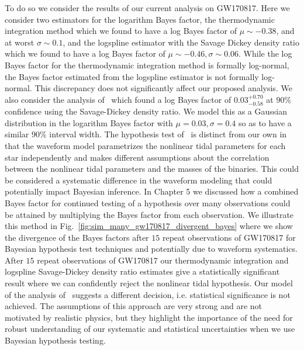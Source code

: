 To do so we consider the results of our current analysis on GW170817. Here we consider two estimators for the logarithm Bayes factor, the thermodynamic integration method which we found to have a log Bayes factor of $\mu \sim -0.38$, and at worst $\sigma \sim 0.1$, and the logspline estimator with the Savage Dickey density ratio which we found to have a log Bayes factor of $\mu \sim -0.46, \sigma \sim 0.06$. While the log Bayes factor for the thermodynamic integration method is formally log-normal, the Bayes factor estimated from the logspline estimator is not formally log-normal. This discrepancy does not significantly affect our proposed analysis. We also consider the analysis of~\cite{abbott2019constraining} which found a log Bayes factor of $0.03^{+0.70}_{-0.58}$ at $90 \%$ confidence using the Savage-Dickey density ratio. We model this as a Gaussian distribution in the logarithm Bayes factor with $\mu = 0.03, \sigma = 0.4$ so as to have a similar $90\%$ interval width. The hypothesis test of~\cite{abbott2019constraining} is distinct from our own in that the waveform model parametrizes the nonlinear tidal parameters for each star independently and makes different assumptions about the correlation between the nonlinear tidal parameters and the masses of the binaries. This could be considered a systematic difference in the waveform modeling that could potentially impact Bayesian inference. In Chapter 5 we discussed how a combined Bayes factor for continued testing of a hypothesis over many observations could be attained by multiplying the Bayes factor from each observation. We illustrate this method in Fig.~\ref{fig:sim_many_gw170817_divergent_bayes} where we show the divergence of the Bayes factors after $15$ repeat observations of GW170817 for Bayesian hypothesis test techniques and potentially due to waveform systematics. After $15$ repeat observations of GW170817 our thermodynamic integration and logspline Savage-Dickey density ratio estimates give a statistically significant result where we can confidently reject the nonlinear tidal hypothesis. Our model of the analysis of~\cite{abbott2019constraining} suggests a different decision, i.e. statistical significance is not achieved. The assumptions of this approach are very strong and are not motivated by realistic physics, but they highlight the importance of the need for robust understanding of our systematic and statistical uncertainties when we use Bayesian hypothesis testing. 

